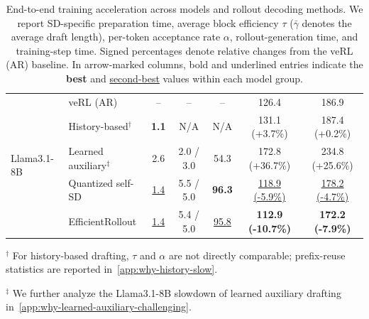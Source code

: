 \documentclass{llmxive}
\providecommand{\methodtitle}{EfficientRollout}
\providecommand{\nosd}{veRL (AR)}
\providecommand{\Alwayssd}{Quantized self-SD}
\providecommand{\history}{history-based drafting}
\providecommand{\learned}{learned auxiliary drafting}
\providecommand{\mal}{\tau}
\begin{document}
\begin{table}[t]
\begin{tabular}{llccccc}
\midrule

\multirow{5}{*}{Llama3.1-8B}
& \nosd{}
& --
& --
& --
& 126.4
& 186.9 \\
& History-based$^\dagger$
& \textbf{1.1}
& N/A
& N/A
& 131.1 (+3.7\%)
& 187.4 (+0.2\%) \\
& Learned auxiliary$^\ddagger$
& 2.6
& 2.0 / 3.0
& 54.3
& 172.8 (+36.7\%)
& 234.8 (+25.6\%) \\
& \Alwayssd{}
& \underline{1.4}
& 5.5 / 5.0
& \textbf{96.3}
& \underline{118.9 (-5.9\%)}
& \underline{178.2 (-4.7\%)} \\
\rowcolor{gray!10}
\cellcolor{white}
& \methodtitle{}
& \underline{1.4}
& 5.4 / 5.0
& \underline{95.8}
& \textbf{112.9 (-10.7\%)}
& \textbf{172.2 (-7.9\%)} \\

\bottomrule
\end{tabular}

\vspace{2pt}
\begin{minipage}{0.98\linewidth}
\footnotesize
$^\dagger$ For \history{}, $\mal$ and $\alpha$ are not directly comparable; prefix-reuse statistics are reported in~\cref{app:why-history-slow}.

$^\ddagger$ We further analyze the Llama3.1-8B slowdown of \learned{} in~\cref{app:why-learned-auxiliary-challenging}.
\end{minipage}
\caption{
End-to-end training acceleration across models and rollout decoding methods.
We report SD-specific preparation time, average block efficiency $\mal$ ($\bar{\gamma}$ denotes the average draft length), per-token acceptance rate $\alpha$, rollout-generation time, and training-step time.
Signed percentages denote relative changes from the \nosd{} baseline.
In arrow-marked columns, bold and underlined entries indicate the \textbf{best} and \underline{second-best} values within each model group.
}
\label{tab:e2e_speedup}
\end{table}
\end{document}
